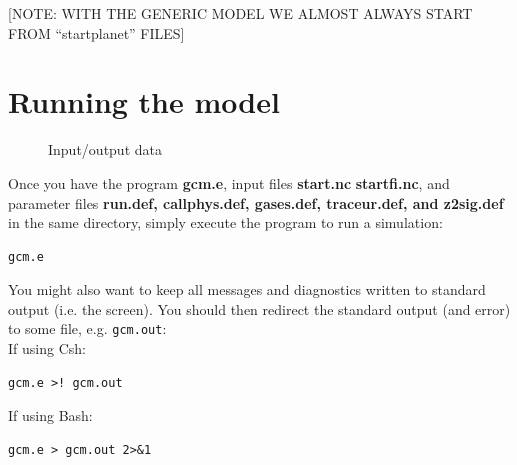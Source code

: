 [NOTE: WITH THE GENERIC MODEL WE ALMOST ALWAYS START FROM ``startplanet'' FILES]

\section{Running the model}
\begin{figure}
\centerline{}
\caption{Input/output data}
\label{fig:inout}
\end{figure}

Once you have the program {\bf gcm.e},
input files {\bf start.nc} {\bf startfi.nc},
and parameter files {\bf run.def, callphys.def, gases.def, traceur.def, and z2sig.def}
in the same directory, simply execute the program to run a simulation:
\begin{verbatim}
gcm.e
\end{verbatim}

You might also want to keep all messages and diagnostics written to standard
output (i.e. the screen). You should then redirect the standard output
(and error) to some file, e.g. {\tt gcm.out}:\\
If using Csh:
\begin{verbatim}
gcm.e >! gcm.out
\end{verbatim}
If using Bash:
\begin{verbatim}
gcm.e > gcm.out 2>&1
\end{verbatim}


